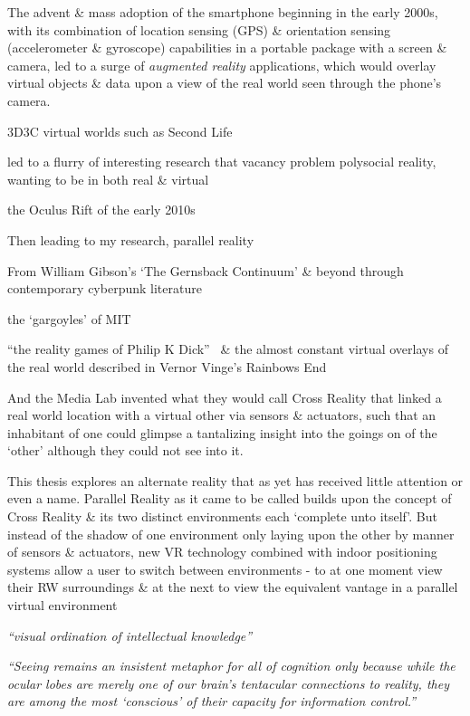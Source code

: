 The advent \& mass adoption of the smartphone beginning in the early 2000s, with its combination of location sensing (GPS) \& orientation sensing (accelerometer \& gyroscope) capabilities in a portable package with a screen \& camera, led to a surge of \textit{augmented reality} applications, which would overlay virtual objects \& data upon a view of the real world seen through the phone's camera.


3D3C virtual worlds such as Second Life

led to a flurry of interesting research that
vacancy problem
polysocial reality, wanting to be in both real \& virtual

the Oculus Rift of the early 2010s



Then leading to my research, parallel reality




From William Gibson's `The Gernsback Continuum' \& beyond through contemporary cyberpunk literature

the `gargoyles' of MIT

``the reality games of Philip K Dick''~\cite{Sterling1988} \& the almost constant virtual overlays of the real world described in Vernor Vinge's Rainbows End~\cite{Vinge2006}






And the Media Lab invented what they would call Cross Reality that linked a real world location with a virtual other via sensors \& actuators, such that an inhabitant of one could glimpse a tantalizing insight into the goings on of the `other' although they could not see into it.

This thesis explores an alternate reality that as yet has received little attention or even a name. Parallel Reality as it came to be called builds upon the concept of Cross Reality \& its two distinct environments each `complete unto itself'. But instead of the shadow of one environment only laying upon the other by manner of sensors \& actuators, new VR technology combined with indoor positioning systems allow a user to switch between environments - to at one moment view their RW surroundings \& at the next to view the equivalent vantage in a parallel virtual environment


\textit{``visual ordination of intellectual knowledge''}

\textit{``Seeing remains an insistent metaphor for all of cognition only because while the ocular lobes are merely one of our brain's tentacular connections to reality, they are among the most `conscious' of their capacity for information control.''}

